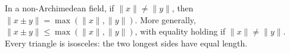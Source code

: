 In a non-Archimedean field, if $\|x\| \neq \|y\|$, then $\|x \pm y\| = \max(\|x\|, \|y\|)$. More generally, $\|x \pm y\| \leq \max(\|x\|, \|y\|)$, with equality holding if $\|x\| \neq \|y\|$. Every triangle is isosceles: the two longest sides have equal length.